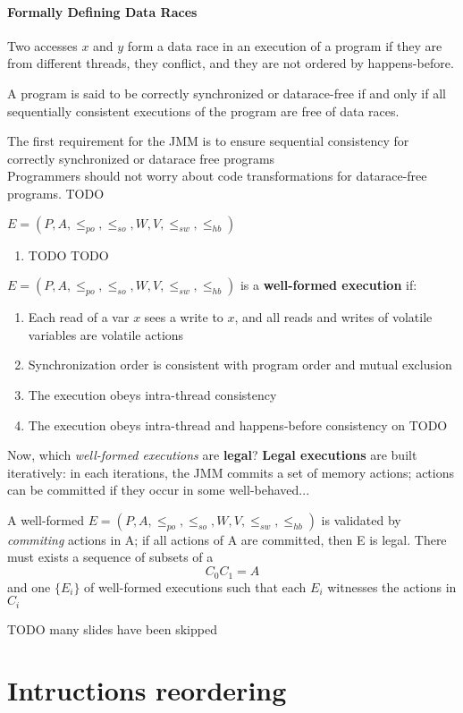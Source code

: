 \paragraph{Formally Defining Data Races}
Two accesses $x$ and $y$ form a data race in an execution of a program if they are from different threads, they conflict, and they are not ordered by happens-before.

A program is said to be correctly synchronized or datarace-free if and only if all sequentially consistent executions of the program are free of data races.

The first requirement for the JMM is to ensure sequential consistency for correctly synchronized or datarace free programs\\
Programmers should not worry about code transformations for datarace-free programs.
TODO

{
   $E = (P,A,\leq_{po},\leq_{so},W,V,\leq_{sw},\leq_{hb})$
   \begin{enumerate}
   \item TODO
   TODO
\end{enumerate}}

$E = (P,A,\leq_{po},\leq_{so},W,V,\leq_{sw},\leq_{hb})$ is a \textbf{well-formed execution} if:
\begin{enumerate}
   \item Each read of a var $x$ sees a write to $x$, and all reads and writes of volatile variables are volatile actions
   \item Synchronization order is consistent with program order and mutual exclusion
   \item The execution obeys intra-thread consistency
   \item The execution obeys intra-thread and happens-before consistency on
   TODO

\end{enumerate}

Now, which \textit{well-formed executions} are \textbf{legal}?
\textbf{Legal executions} are built iteratively:
in each iterations, the JMM commits a set of memory actions;
actions can be committed if they occur in some well-behaved...

A well-formed $E = (P,A,\leq_{po},\leq_{so},W,V,\leq_{sw},\leq_{hb})$ is validated by \textit{commiting} actions in A;
if all actions of A are committed, then E is legal.
There must exists a sequence of subsets of a
\[
  C_0 C_1 = A 
\]
and one $\{E_i\}$ of well-formed executions such that each $E_i$ witnesses the actions in $C_i$


TODO many slides have been skipped

\section{Intructions reordering}